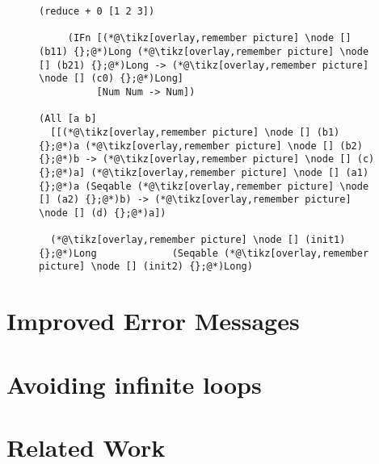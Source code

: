 \documentclass[9pt]{extarticle}
\begin{document}
\begin{figure}
\begin{lstlisting}
(reduce + 0 [1 2 3])

     (IFn [(*@\tikz[overlay,remember picture] \node [] (b11) {};@*)Long (*@\tikz[overlay,remember picture] \node [] (b21) {};@*)Long -> (*@\tikz[overlay,remember picture] \node [] (c0) {};@*)Long]
          [Num Num -> Num])

(All [a b]
  [[(*@\tikz[overlay,remember picture] \node [] (b1) {};@*)a (*@\tikz[overlay,remember picture] \node [] (b2) {};@*)b -> (*@\tikz[overlay,remember picture] \node [] (c) {};@*)a] (*@\tikz[overlay,remember picture] \node [] (a1) {};@*)a (Seqable (*@\tikz[overlay,remember picture] \node [] (a2) {};@*)b) -> (*@\tikz[overlay,remember picture] \node [] (d) {};@*)a])

  (*@\tikz[overlay,remember picture] \node [] (init1) {};@*)Long             (Seqable (*@\tikz[overlay,remember picture] \node [] (init2) {};@*)Long)

\end{lstlisting}
\end{figure}

\section{Improved Error Messages}

\section{Avoiding infinite loops}


\section{Related Work}


\printbibliography
\end{document}
